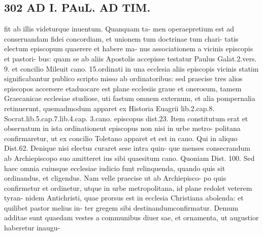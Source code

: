 \documentclass{article}
\begin{document}
\begin{pages}
\section*{302 AD I. PAuL. AD TIM. }fit ab illis videturque inuentum. Quanquam ta- men operaepretium est ad conseruandam fidei concordiam, et unionem tum doctrinae tum chari- tatis electum episcopum quaerere et habere ma- nus associationem a vicinis episcopis et pastori- bus: quam se ab aliis Apostolis accepisse testatur Paulus Galat.2.vers. 9. et concilio Mileuit cano. 15.ordinati in una ecclesia aliis episcopis vicinis statim significabantur publico scripto misso ab ordinatoribus: sed praecise tres alios episcopos accersere etaduocare est plane ecclesiis graue et onerosum, tamem Graecanicae ecclesiae studiose, uti fastum omnem externum, et alia pompernalia retinuerunt, quemadmodum apparet ex Historia Euagrii lib.2.cap.8. Socrat.lib.5.cap.7.lib.4.cap. 3.cano. episcopus dist.23. Item constitutum erat et obseruatum in ista ordinationeut episcopus non nisi in urbe metro- politana confirmaretur, ut ex concilio Toletano apparet et est in cano. Qui in aliquo Dist.62. Denique nisi electus curaret sese intra quin- que menses consecrandum ab Archiepiscopo suo amitteret ius sibi quaesitum cano. Quoniam Dist. 100. Sed haec omnia cuiusque ecclesiae iudicio funt relinquenda, quando quis sit ordinandus, et cligendus. Nam velle praecise ut ab Archiepisco- po quis confirmetur et ordinetur, utque in urbe metropolitana, id plane redolet veterem tyran- nidem Antichristi, quae prorsus est in ecclesia Christiana abolenda: et quilibet pastor melius in- ter gregem sibi destinandumconfirmatur. Demum additae sunt quaedam vestes a communibus diuer sae, et ornamenta, ut augustior haberetur inaugu- 

\end{pages}
\end{document}
